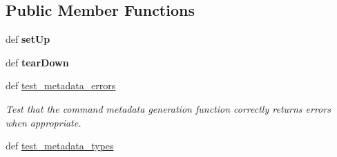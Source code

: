 \subsection*{Public Member Functions}
\begin{DoxyCompactItemize}
\item 
\hypertarget{classhwm_1_1command_1_1tests_1_1test__command__infrastructure_1_1_test_command_infrastructure_a40baf14bcb9561dffe6d2e6b0949a88b}{def {\bfseries set\-Up}}\label{classhwm_1_1command_1_1tests_1_1test__command__infrastructure_1_1_test_command_infrastructure_a40baf14bcb9561dffe6d2e6b0949a88b}

\item 
\hypertarget{classhwm_1_1command_1_1tests_1_1test__command__infrastructure_1_1_test_command_infrastructure_aa6f71a5d68ae62232e8f763ba26b1fb9}{def {\bfseries tear\-Down}}\label{classhwm_1_1command_1_1tests_1_1test__command__infrastructure_1_1_test_command_infrastructure_aa6f71a5d68ae62232e8f763ba26b1fb9}

\item 
def \hyperlink{classhwm_1_1command_1_1tests_1_1test__command__infrastructure_1_1_test_command_infrastructure_a70517c8437a993333a97942973a07c84}{test\-\_\-metadata\-\_\-errors}
\begin{DoxyCompactList}\small\item\em Test that the command metadata generation function correctly returns errors when appropriate. \end{DoxyCompactList}\item 
\hypertarget{classhwm_1_1command_1_1tests_1_1test__command__infrastructure_1_1_test_command_infrastructure_a4aea96055a33c01261c0257df493c66f}{def \hyperlink{classhwm_1_1command_1_1tests_1_1test__command__infrastructure_1_1_test_command_infrastructure_a4aea96055a33c01261c0257df493c66f}{test\-\_\-metadata\-\_\-types}}\label{classhwm_1_1command_1_1tests_1_1test__command__infrastructure_1_1_test_command_infrastructure_a4aea96055a33c01261c0257df493c66f}


\end{DoxyCompactItemize}
